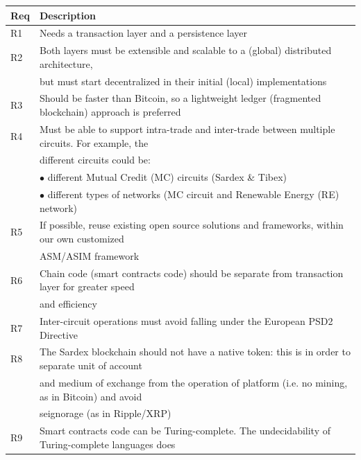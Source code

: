 \begin{table}[htbp]
\begin{centering}
\small
{\begin{tabular}{| l | l | }
\hline
\textbf{Req}	& \textbf{Description} \\
\hline
R1 &Needs a transaction layer and a persistence layer\\
\hline
R2 & Both layers must be extensible and scalable to a (global) distributed architecture, \\
&\hspace{0.5cm}but must start decentralized in their initial (local) implementations\\
\hline
R3 &Should be faster than Bitcoin, so a lightweight ledger (fragmented blockchain) approach is preferred	\\
\hline
R4 &Must be able to support intra-trade and inter-trade between multiple circuits. For example, the \\
&\hspace{0.5cm}different circuits could be: \\
&\hspace{1cm}$\bullet$ different Mutual Credit (MC) circuits (Sardex \& Tibex)\\
&\hspace{1cm}$\bullet$ different types of networks (MC circuit and Renewable Energy (RE) network)\\
\hline
R5 &If possible, reuse existing open source solutions and frameworks, within our own customized\\
&\hspace{0.5cm}ASM/ASIM framework \\
\hline
R6 &Chain code (smart contracts code) should be separate from transaction layer for greater speed\\
&\hspace{0.5cm}and efficiency \\
\hline
R7 &Inter-circuit operations must avoid falling under the European PSD2 Directive\\
\hline
R8 &The Sardex blockchain should not have a native token: this is in order to separate unit of account \\
&\hspace{0.5cm}and medium of exchange from the operation of platform (i.e. no mining, as in Bitcoin) and avoid\\
&\hspace{0.5cm}seignorage (as in Ripple/XRP)	\\
\hline
R9 &Smart contracts code can be Turing-complete. The undecidability of Turing-complete languages does\\

\end{tabular}}
\end{centering}
\end{table}

